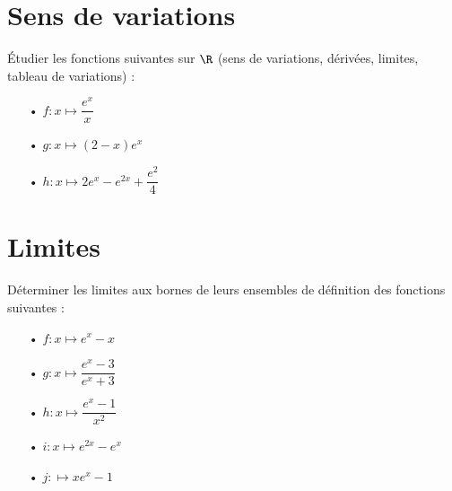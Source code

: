 \section{Sens de variations}

Étudier les fonctions suivantes sur $\R$ (sens de variations, dérivées, limites, tableau de variations) : \\

\begin{itemize}
\item[•] $f : x \longmapsto \dfrac{e^x}{x}$ \\

\item[•] $g : x \longmapsto \left(2 - x\right)e^x$ \\

\item[•] $h : x \longmapsto 2e^x - e^{2x} + \dfrac{e^2}{4}$ 
\end{itemize}

\section{Limites}

Déterminer les limites aux bornes de leurs ensembles de définition des fonctions suivantes : \\

\begin{itemize}
\item[•] $f : x \longmapsto e^x - x$ \\
\item[•] $g : x \longmapsto \dfrac{e^x - 3}{e^x + 3}$ \\
\item[•] $h : x \longmapsto \dfrac{e^x - 1}{x^2}$ \\
\item[•] $i : x \longmapsto e^{2x} - e^x$ \\
\item[•] $j : \longmapsto xe^x - 1$ \\
\end{itemize}


